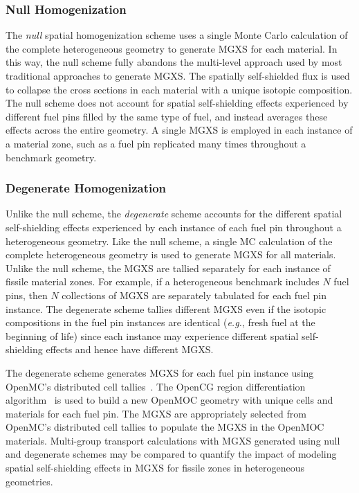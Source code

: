 \subsubsection{Null Homogenization}
\label{subsubsec:homogenize-null}

The \textit{null} spatial homogenization scheme uses a single Monte Carlo calculation of the complete heterogeneous geometry to generate MGXS for each material. In this way, the null scheme fully abandons the multi-level approach used by most traditional approaches to generate MGXS. The spatially self-shielded flux is used to collapse the cross sections in each material with a unique isotopic composition. The null scheme does not account for spatial self-shielding effects experienced by different fuel pins filled by the same type of fuel, and instead averages these effects across the entire geometry. A single MGXS is employed in each instance of a material zone, such as a fuel pin replicated many times throughout a benchmark geometry.

\subsubsection{Degenerate Homogenization}
\label{subsubsec:homogenize-degenerate}

Unlike the null scheme, the \textit{degenerate} scheme accounts for the different spatial self-shielding effects experienced by each instance of each fuel pin throughout a heterogeneous geometry. Like the null scheme, a single MC calculation of the complete heterogeneous geometry is used to generate MGXS for all materials. Unlike the null scheme, the MGXS are tallied separately for each instance of fissile material zones. For example, if a heterogeneous benchmark includes $N$ fuel pins, then $N$ collections of MGXS are separately tabulated for each fuel pin instance. The degenerate scheme tallies different MGXS even if the isotopic compositions in the fuel pin instances are identical (\textit{e.g.}, fresh fuel at the beginning of life) since each instance may experience different spatial self-shielding effects and hence have different MGXS.

The degenerate scheme generates MGXS for each fuel pin instance using OpenMC's distributed cell tallies~\citep{lax2014distribcell}. The OpenCG region differentiation algorithm~\citep{boyd2015opencg} is used to build a new OpenMOC geometry with unique cells and materials for each fuel pin. The MGXS are appropriately selected from OpenMC's distributed cell tallies to populate the MGXS in the OpenMOC materials. Multi-group transport calculations with MGXS generated using null and degenerate schemes may be compared to quantify the impact of modeling spatial self-shielding effects in MGXS for fissile zones in heterogeneous geometries.